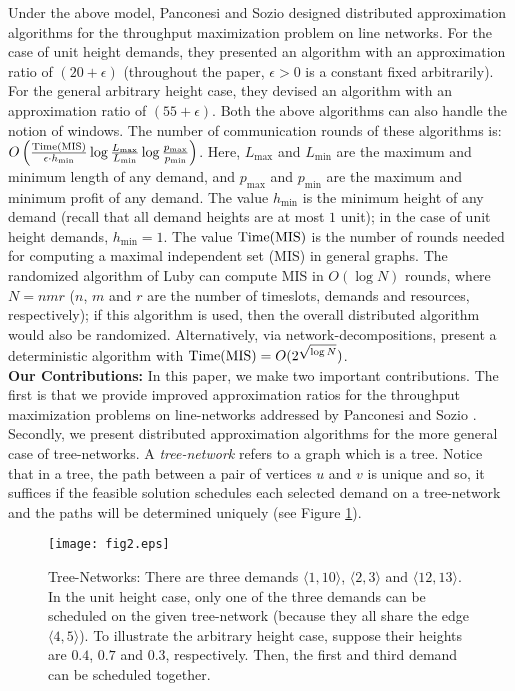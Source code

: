 \documentclass[11pt]{article}
\newcommand{\TMIS} {{\rm Time(MIS)}}
\newcommand{\pair}[2] {\langle #1,#2 \rangle}
\begin{document}
Under the above model, Panconesi and Sozio \cite{Pancj} designed distributed approximation
algorithms for the throughput maximization problem on line networks.
For the case of unit height demands, they presented an algorithm with an approximation ratio of $(20+\epsilon)$
(throughout the paper, $\epsilon>0$ is a constant fixed arbitrarily).
For the general arbitrary height case, they devised an algorithm with an approximation ratio of $(55+\epsilon)$.
Both the above algorithms can also handle the notion of windows.
The number of communication rounds of these algorithms is:
$O\left(\frac{\TMIS}{\epsilon\cdot h_{\min}} \log{\frac{L_{\max}}{L_{\min}}} \log{\frac{p_{\max}}{p_{\min}}}\right)$.
Here, $L_{\max}$ and $L_{\min}$ are the maximum and minimum length of any demand,
and $p_{\max}$ and $p_{\min}$ are the maximum and minimum profit of any demand.
The value $h_{\min}$ is the minimum height of any demand (recall that all demand heights are at most $1$ unit);
in the case of unit height demands, $h_{\min}=1$.
The value $\TMIS$ is the number of rounds needed for computing a maximal independent set (MIS) in general graphs.
The randomized algorithm of Luby \cite{Luby} can compute MIS in $O(\log N)$ rounds,
where $N=nmr$ ($n$, $m$ and $r$ are the number of timeslots, demands and resources, respectively);
if this algorithm is used, then the overall distributed algorithm would also be randomized.
Alternatively, via network-decompositions, \cite{PancSrini} present a deterministic algorithm 
with $\TMIS = O(2^{\sqrt{\log N}})$.\\

\noindent
{\bf Our Contributions: }In this paper, we make two important contributions. 
The first is that we provide improved approximation ratios
for the throughput maximization problems on line-networks addressed by Panconesi and Sozio \cite{Pancj}. 
Secondly, we present distributed approximation algorithms for the more general case of tree-networks.
A {\em tree-network} refers to a graph which is a tree. 
Notice that in a tree, the path between a pair of vertices $u$ and $v$ is unique
and so, it suffices if the feasible solution schedules each selected demand on a tree-network
and the paths will be determined uniquely (see Figure \ref{fig:2}).

\begin{figure}[t]
\centering
\texttt{[image: fig2.eps]}
\caption{
Tree-Networks: There are three demands $\pair{1}{10}$, $\pair{2}{3}$ and $\pair{12}{13}$.
In the unit height case, only one of the three demands can be scheduled on the given tree-network
(because they all share the edge $\pair{4}{5}$).
To illustrate the arbitrary height case, suppose their heights are $0.4$, $0.7$ and $0.3$, respectively.
Then, the first and third demand can be scheduled together.
}
\label{fig:2}
\end{figure}
\end{document}
